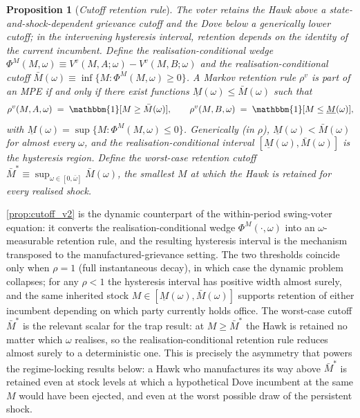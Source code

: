 \documentclass[11pt,twoside]{extarticle}
\newtheorem{proposition}{Proposition}
\begin{document}
\begin{proposition}[\emph{Cutoff retention rule}]\label{prop:cutoff_v2}
\emph{The voter retains the Hawk above a state-and-shock-dependent grievance cutoff and the Dove below a generically lower cutoff; in the intervening hysteresis interval, retention depends on the identity of the current incumbent.}
Define the realisation-conditional wedge $\Phi^M(M,\omega)\equiv V^v(M,A;\omega)-V^v(M,B;\omega)$ and the realisation-conditional cutoff $\bar M(\omega)\equiv\inf\{M:\Phi^M(M,\omega)\ge 0\}$. A Markov retention rule $\rho^v$ is part of an MPE if and only if there exist functions $\underline M(\omega)\le\bar M(\omega)$ such that
\begin{equation}\label{eq:retention_v2}
    \rho^v(M,A,\omega)\;=\;\mathbbm{1}[M\ge\bar M(\omega)],\qquad\rho^v(M,B,\omega)\;=\;\mathbbm{1}[M\le\underline M(\omega)],
\end{equation}
with $\underline M(\omega)=\sup\{M:\Phi^M(M,\omega)\le 0\}$. Generically (in $\rho$), $\underline M(\omega)<\bar M(\omega)$ for almost every $\omega$, and the realisation-conditional interval $[\underline M(\omega),\bar M(\omega)]$ is the \emph{hysteresis region}. Define the worst-case retention cutoff $\bar M^*\equiv\sup_{\omega\in[0,\bar\omega]}\bar M(\omega)$, the smallest $M$ at which the Hawk is retained for \emph{every} realised shock.
\end{proposition}

\autoref{prop:cutoff_v2} is the dynamic counterpart of the within-period swing-voter equation: it converts the realisation-conditional wedge $\Phi^M(\cdot,\omega)$ into an $\omega$-measurable retention rule, and the resulting hysteresis interval is the \citet{coatePolicyPersistence1999} mechanism transposed to the manufactured-grievance setting. The two thresholds coincide only when $\rho=1$ (full instantaneous decay), in which case the dynamic problem collapses; for any $\rho<1$ the hysteresis interval has positive width almost surely, and the same inherited stock $M\in[\underline M(\omega),\bar M(\omega)]$ supports retention of either incumbent depending on which party currently holds office. The worst-case cutoff $\bar M^*$ is the relevant scalar for the trap result: at $M\ge\bar M^*$ the Hawk is retained no matter which $\omega$ realises, so the realisation-conditional retention rule reduces almost surely to a deterministic one. This is precisely the asymmetry that powers the regime-locking results below: a Hawk who manufactures its way above $\bar M^*$ is retained even at stock levels at which a hypothetical Dove incumbent at the same $M$ would have been ejected, and even at the worst possible draw of the persistent shock.
\end{document}
